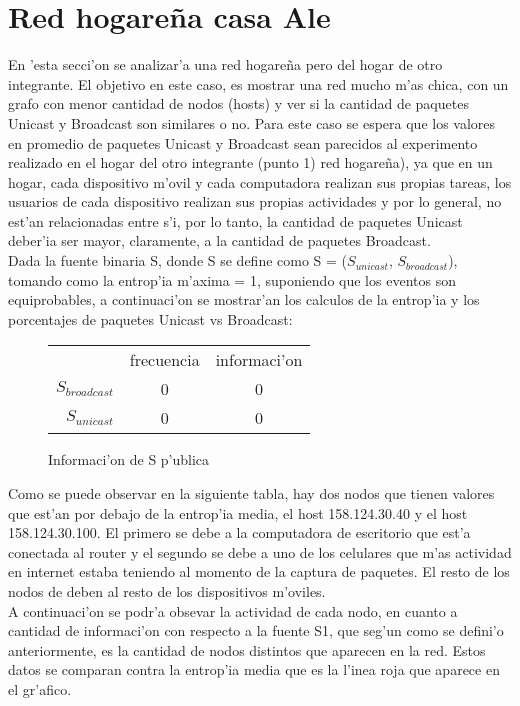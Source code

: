 \section{Red hogare\~na casa Ale}

En 'esta secci'on se analizar'a una red hogare\~na pero del hogar de otro integrante. El objetivo en este caso, es mostrar una red mucho m'as chica,
con un grafo con menor cantidad de nodos (hosts) y ver si la cantidad de paquetes Unicast y Broadcast son similares o no. 
Para este caso se espera que los valores en promedio de paquetes Unicast y Broadcast sean parecidos al experimento realizado en el hogar del 
otro integrante (punto 1) red hogare\~na), ya que en un hogar, cada dispositivo m'ovil 
y cada computadora realizan sus propias tareas, los usuarios de cada dispositivo realizan sus propias actividades y por lo general, no est'an 
relacionadas entre s'i, por lo tanto, la cantidad de paquetes Unicast deber'ia ser mayor, claramente, a la cantidad de paquetes Broadcast. \\

Dada la fuente binaria S, donde S se define como S = ($S_{unicast}$, $S_{broadcast}$), tomando como la entrop'ia m'axima = 1, suponiendo 
que los eventos son equiprobables, a continuaci'on se mostrar'an los calculos de la entrop'ia y los porcentajes de paquetes Unicast vs Broadcast:


\begin{figure}[!h]
\centering
\caption{Informaci'on de S p'ublica}
\begin{tabular}{ r|c|c| }
\multicolumn{1}{r}{}
 &  \multicolumn{1}{c}{frecuencia}
 & \multicolumn{1}{c}{informaci'on} \\
\cline{2-3}
$S_{broadcast}$ & 0 & 0 \\
\cline{2-3}
$S_{unicast}$ & 0 & 0 \\
\cline{2-3}
\end{tabular}
\end{figure}

Como se puede observar en la siguiente tabla, hay dos nodos que tienen valores que est'an por debajo de la entrop'ia media,
el host 158.124.30.40 y el host 158.124.30.100. El primero se debe a la computadora de escritorio que est'a conectada al router y el 
segundo se debe a uno de los celulares que m'as actividad en internet estaba teniendo al momento de la captura de paquetes. El resto
de los nodos de deben al resto de los dispositivos m'oviles. \\ 

A continuaci'on se podr'a obsevar la actividad de cada nodo, en cuanto a cantidad de informaci'on con respecto a la fuente S1,
que seg'un como se defini'o anteriormente, es la cantidad de nodos distintos que aparecen en la red. Estos datos se comparan 
contra la entrop'ia media que es la l'inea roja que aparece en el gr'afico. 
 
